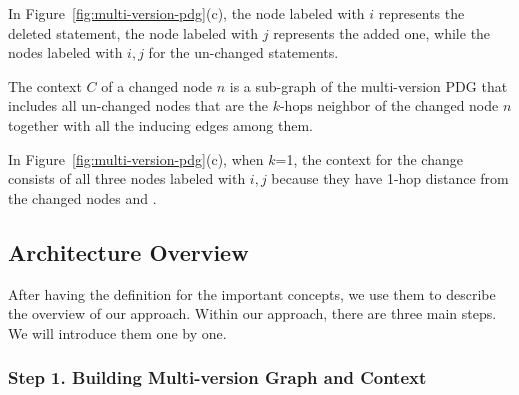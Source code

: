 In Figure~\ref{fig:multi-version-pdg}(c), the node labeled with $i$
represents the deleted statement, the node labeled with $j$ represents
the added one, while the nodes labeled with $i,j$ for the un-changed
statements.


\begin{Definition}[Context]
The context $C$ of a changed node $n$ is a sub-graph of the
multi-version PDG that includes all un-changed nodes that are the
$k$-hops neighbor of the changed node $n$ together with all the
inducing edges among them.
\end{Definition}

In Figure~\ref{fig:multi-version-pdg}(c), when $k$=1, the context for
the change consists of all three nodes labeled with $i,j$ because they have
1-hop distance from the changed nodes  and
.




\subsection{Architecture Overview}

After having the definition for the important concepts, we use them to describe the overview of our approach. Within our approach, there are three main steps. We will introduce them one by one.

\subsubsection{Step 1. Building Multi-version Graph and Context}

